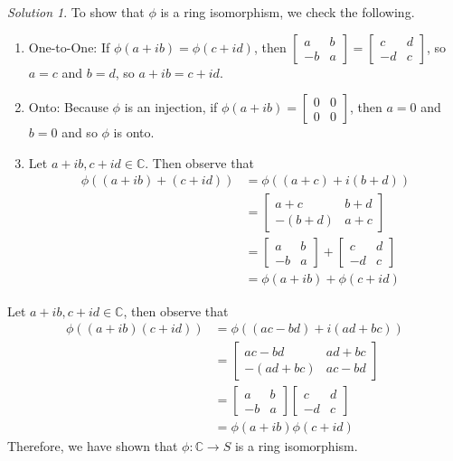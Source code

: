 \documentclass[11pt]{amsart}
\theoremstyle{definition}\newtheorem{question}{Question}
\theoremstyle{definition}\newtheorem{claim}{Claim}
\theoremstyle{remark}\newtheorem*{solution}{Solution}
\newcommand{\C}{\mathbb{C}}
\begin{document}
\begin{solution}
    To show that $\phi$ is a ring isomorphism, we check the following.
    \begin{enumerate}
        \item One-to-One: If $\phi(a + ib) = \phi(c + id)$, then $\begin{bmatrix} a & b \\ -b & a \end{bmatrix} = \begin{bmatrix} c & d \\ -d & c \end{bmatrix}$, so $a = c$ and $b = d$, so $a + ib = c + id$.
        \item Onto: Because $\phi$ is an injection, if $\phi(a + ib) = \begin{bmatrix} 0 & 0 \\ 0 & 0 \end{bmatrix}$, then $a = 0$ and $b = 0$ and so $\phi$ is onto.
        \item Let $a + ib, c + id \in \C$. Then observe that
        \begin{align*}
            \phi((a + ib) + (c + id)) &= \phi((a + c) + i(b + d)) \\
            &= \begin{bmatrix} a + c & b + d \\
                -(b + d) & a + c
            \end{bmatrix} \\
            &= \begin{bmatrix} a & b \\ -b & a \end{bmatrix} + \begin{bmatrix} c & d \\ -d & c \end{bmatrix} \\
            &= \phi(a + ib) + \phi(c + id)
        \end{align*}
    \end{enumerate}
    \item Let $a + ib, c + id \in \C$, then observe that
    \begin{align*}
        \phi((a + ib)(c + id)) &= \phi((ac - bd) + i(ad + bc)) \\
        &= \begin{bmatrix} ac - bd & ad + bc \\ -(ad + bc) & ac - bd \end{bmatrix} \\
        &= \begin{bmatrix} a & b \\ -b & a \end{bmatrix}\begin{bmatrix} c & d \\ -d & c \end{bmatrix} \\
        &= \phi(a + ib)\phi(c + id)
    \end{align*}
    Therefore, we have shown that $\phi : \C \to S$ is a ring isomorphism.
\end{solution}
\end{document}
